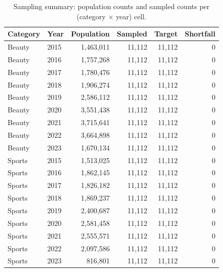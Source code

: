 \begin{table}[h]
\centering
\caption{Sampling summary: population counts and sampled counts per (category $\times$ year) cell.}
\label{tab:sampling_summary}
\begin{tabular}{llrrrr}
\toprule
Category & Year & Population & Sampled & Target & Shortfall \\
\midrule
Beauty & 2015 & 1,463,011 & 11,112 & 11,112 & 0 \\
Beauty & 2016 & 1,757,268 & 11,112 & 11,112 & 0 \\
Beauty & 2017 & 1,780,476 & 11,112 & 11,112 & 0 \\
Beauty & 2018 & 1,906,274 & 11,112 & 11,112 & 0 \\
Beauty & 2019 & 2,586,112 & 11,112 & 11,112 & 0 \\
Beauty & 2020 & 3,551,438 & 11,112 & 11,112 & 0 \\
Beauty & 2021 & 3,715,641 & 11,112 & 11,112 & 0 \\
Beauty & 2022 & 3,664,898 & 11,112 & 11,112 & 0 \\
Beauty & 2023 & 1,670,134 & 11,112 & 11,112 & 0 \\
Sports & 2015 & 1,513,025 & 11,112 & 11,112 & 0 \\
Sports & 2016 & 1,862,145 & 11,112 & 11,112 & 0 \\
Sports & 2017 & 1,826,182 & 11,112 & 11,112 & 0 \\
Sports & 2018 & 1,869,237 & 11,112 & 11,112 & 0 \\
Sports & 2019 & 2,400,687 & 11,112 & 11,112 & 0 \\
Sports & 2020 & 2,581,458 & 11,112 & 11,112 & 0 \\
Sports & 2021 & 2,555,571 & 11,112 & 11,112 & 0 \\
Sports & 2022 & 2,097,586 & 11,112 & 11,112 & 0 \\
Sports & 2023 & 816,801 & 11,112 & 11,112 & 0 \\
\bottomrule
\end{tabular}
\end{table}